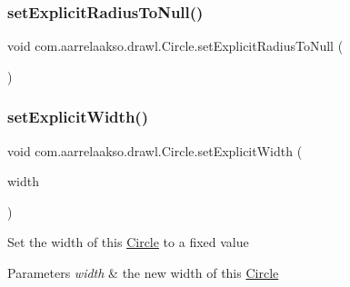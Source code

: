 \subsubsection{\texorpdfstring{set\+Explicit\+Radius\+To\+Null()}{setExplicitRadiusToNull()}}
{\footnotesize\ttfamily void com.\+aarrelaakso.\+drawl.\+Circle.\+set\+Explicit\+Radius\+To\+Null (\begin{DoxyParamCaption}{ }\end{DoxyParamCaption})\hspace{0.3cm}{\ttfamily [private]}}

\mbox{\label{classcom_1_1aarrelaakso_1_1drawl_1_1_circle_a6b4fd174602db84c42763606abfdd98a}} 
\subsubsection{\texorpdfstring{set\+Explicit\+Width()}{setExplicitWidth()}}
{\footnotesize\ttfamily void com.\+aarrelaakso.\+drawl.\+Circle.\+set\+Explicit\+Width (\begin{DoxyParamCaption}\item[{@Nullable \hyperlink{classcom_1_1aarrelaakso_1_1drawl_1_1_sisu_big_decimal}{Sisu\+Big\+Decimal}}]{width }\end{DoxyParamCaption})}

Set the width of this \hyperlink{classcom_1_1aarrelaakso_1_1drawl_1_1_circle}{Circle} to a fixed value


\begin{DoxyParams}{Parameters}
{\em width} & the new width of this \hyperlink{classcom_1_1aarrelaakso_1_1drawl_1_1_circle}{Circle} \\
\hline
\end{DoxyParams}
\mbox{\label{classcom_1_1aarrelaakso_1_1drawl_1_1_shape_a8e4c74480fede49f44519554136c12b0}} 
